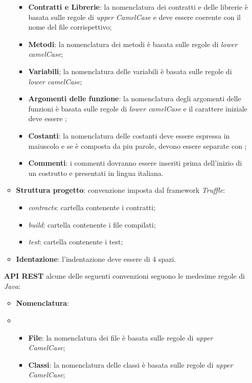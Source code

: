 \begin{itemize}
\begin{itemize}
\begin{itemize}
            \item \textbf{Contratti e Librerie}: la nomenclatura dei contratti e delle librerie è basata sulle regole di \textit{upper CamelCase} e deve essere coerente con il nome del file corrispettivo;
            \item \textbf{Metodi}: la nomenclatura dei metodi è basata sulle regole di \textit{lower camelCase};
            \item \textbf{Variabili}; la nomenclatura delle variabili è basata sulle regole di \textit{lower camelCase};
            \item \textbf{Argomenti delle funzione}: la nomenclatura degli argomenti delle funzioni è basata sulle regole di \textit{lower camelCase} e il carattere iniziale deve essere \textit{\textunderscore};
            \item \textbf{Costanti}: la nomenclatura delle costanti deve essere espressa in maiuscolo e se è composta da piu parole, devono essere separate con \textit{\textunderscore};
            \item \textbf{Commenti}: i commenti dovranno essere inseriti prima dell’inizio di un  costrutto e presentati in lingua italiana.
        \end{itemize}
        \item \textbf{Struttura progetto}: convenzione imposta dal framework \textit{Truffle}:
        \begin{itemize}
            \item \textit{contracts}: cartella contenente i contratti;
            \item \textit{build}: cartella contenente i file compilati;
            \item \textit{test}: cartella contenente i test;
        \end{itemize}
        \item \textbf{Identazione}: l'indentazione deve essere di 4 spazi.
    \end{itemize}
    \textbf{API REST} alcune delle seguenti convenzioni seguono le medesime regole di \textit{Java}:
    \begin{itemize}
        \item \textbf{Nomenclatura}:
        \item \begin{itemize}
            \item \textbf{File}: la nomenclatura dei file è basata sulle regole di \textit{upper CamelCase};
            \item \textbf{Classi}: la nomenclatura delle classi è basata sulle regole di \textit{upper CamelCase};

\end{itemize}
\end{itemize}
\end{itemize}
